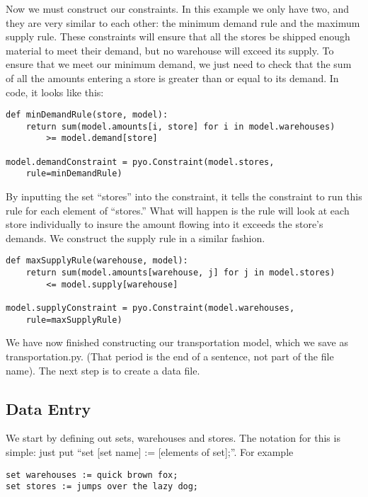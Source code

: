 \documentclass{article}
\begin{document}
Now we must construct our constraints.  In this example we only have two, and they are very similar to each other: the minimum demand rule and the maximum supply rule.  These constraints will ensure that all the stores be shipped enough material to meet their demand, but no warehouse will exceed its supply.  To ensure that we meet our minimum demand, we just need to check that the sum of all the amounts entering a store is greater than or equal to its demand.  In code, it looks like this:

\begin{verbatim}
def minDemandRule(store, model):
    return sum(model.amounts[i, store] for i in model.warehouses) 
        >= model.demand[store]

model.demandConstraint = pyo.Constraint(model.stores, 
    rule=minDemandRule)
\end{verbatim}

\noindent
By inputting the set ``stores'' into the constraint, it tells the constraint to run this rule for each element of ``stores.''  What will happen is the rule will look at each store individually to insure the amount flowing into it exceeds the store's demands.  We construct the supply rule in a similar fashion.

\begin{verbatim}
def maxSupplyRule(warehouse, model):
    return sum(model.amounts[warehouse, j] for j in model.stores) 
        <= model.supply[warehouse]

model.supplyConstraint = pyo.Constraint(model.warehouses, 
    rule=maxSupplyRule)
\end{verbatim}

We have now finished constructing our transportation model, which we save as transportation.py.  (That period is the end of a sentence, not part of the file name).  The next step is to create a data file.

\subsection*{Data Entry}

We start by defining out sets, warehouses and stores.  The notation for this is simple: just put ``set [set name] := [elements of set];''.  For example

\begin{verbatim}
set warehouses := quick brown fox;
set stores := jumps over the lazy dog;
\end{verbatim}
\end{document}
